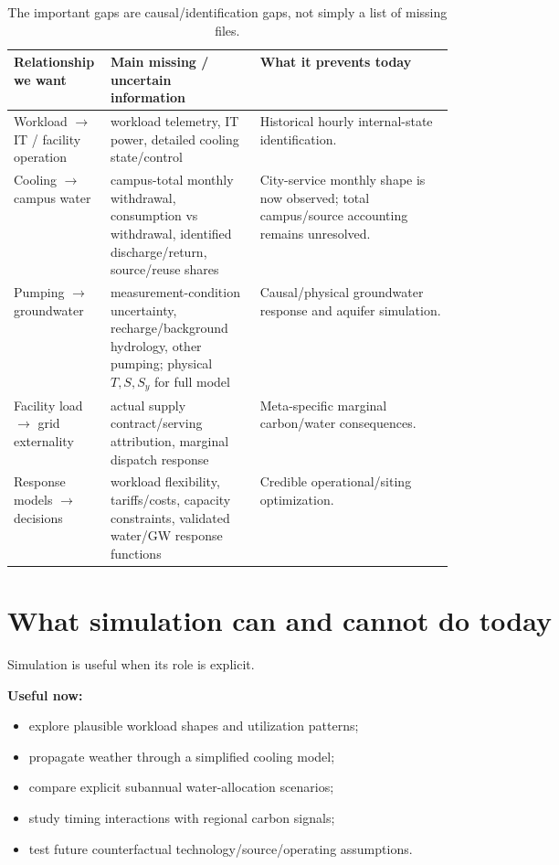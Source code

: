 \documentclass[11pt]{article}
\begin{document}
\begin{table}[ht]
\centering
\scriptsize
\begin{tabularx}{\linewidth}{@{}p{0.22\linewidth}p{0.34\linewidth}Y@{}}
\toprule
\textbf{Relationship we want} & \textbf{Main missing / uncertain information} & \textbf{What it prevents today} \\
\midrule
Workload \(\rightarrow\) IT / facility operation & workload telemetry, IT power, detailed cooling state/control & Historical hourly internal-state identification. \\
Cooling \(\rightarrow\) campus water & campus-total monthly withdrawal, consumption vs withdrawal, identified discharge/return, source/reuse shares & City-service monthly shape is now observed; total campus/source accounting remains unresolved. \\
Pumping \(\rightarrow\) groundwater & measurement-condition uncertainty, recharge/background hydrology, other pumping; physical \(T,S,S_y\) for full model & Causal/physical groundwater response and aquifer simulation. \\
Facility load \(\rightarrow\) grid externality & actual supply contract/serving attribution, marginal dispatch response & Meta-specific marginal carbon/water consequences. \\
Response models \(\rightarrow\) decisions & workload flexibility, tariffs/costs, capacity constraints, validated water/GW response functions & Credible operational/siting optimization. \\
\bottomrule
\end{tabularx}
\caption{The important gaps are causal/identification gaps, not simply a list of missing files.}
\end{table}

\section{What simulation can and cannot do today}

Simulation is useful when its role is explicit.

\textbf{Useful now:}
\begin{itemize}
\item explore plausible workload shapes and utilization patterns;
\item propagate weather through a simplified cooling model;
\item compare explicit subannual water-allocation scenarios;
\item study timing interactions with regional carbon signals;
\item test future counterfactual technology/source/operating assumptions.
\end{itemize}
\end{document}
